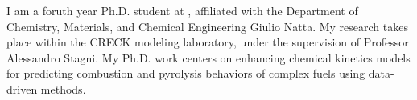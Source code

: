 I am a foruth year Ph.D. student at \polimi, affiliated with the Department of Chemistry,
Materials, and Chemical Engineering Giulio Natta. My research takes place within the
CRECK modeling laboratory, under the supervision of Professor Alessandro Stagni. My Ph.D.
work centers on enhancing chemical kinetics models for predicting combustion and
pyrolysis behaviors of complex fuels using data-driven methods.
%
%
%
